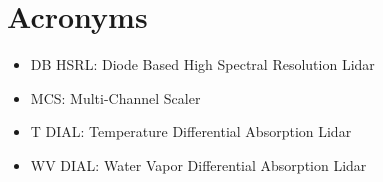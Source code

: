 
\section{Acronyms}

\begin{itemize}
\item{DB HSRL: Diode Based High Spectral Resolution Lidar}
\item{MCS: Multi-Channel Scaler}
\item{T DIAL: Temperature Differential Absorption Lidar}
\item{WV DIAL: Water Vapor Differential Absorption Lidar}
\end{itemize}
\newpage    
